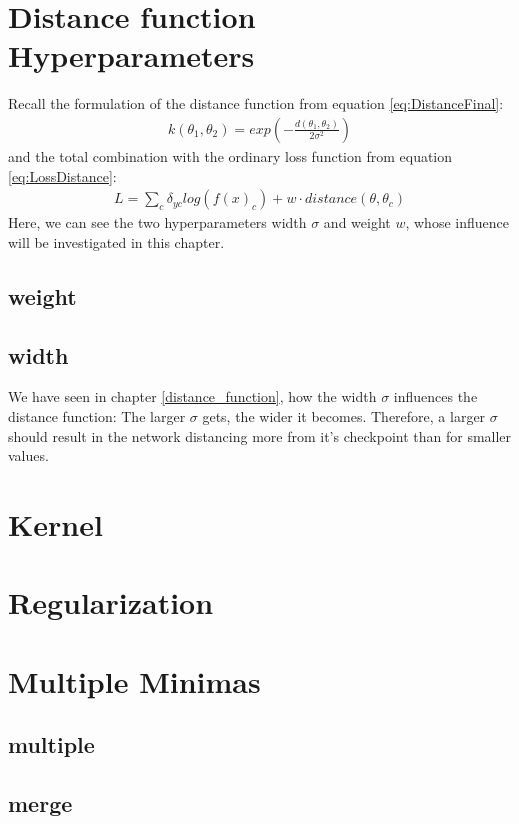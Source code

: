 \section{Distance function Hyperparameters}\label{res:Hyperparameters}
Recall the formulation of the distance function from equation
\ref{eq:DistanceFinal}:
\begin{align}
    k(\theta_1, \theta_2)=exp(-\frac{d(\theta_1, \theta_2)}{2\sigma^2})
\end{align}
and the total combination with the ordinary loss function from equation
\ref{eq:LossDistance}:
\begin{align}
    L=\sum_{c} \delta_{yc} log(f(x)_c) + w \cdot distance(\theta, \theta_c)
\end{align}
Here, we can see the two hyperparameters width $\sigma$ and weight $w$, whose
influence will be investigated in this chapter.
\subsection{weight}

\subsection{width}
We have seen in chapter \ref{distance_function}, how the width $\sigma$
influences the distance function: The larger $\sigma$ gets, the wider it
becomes. Therefore, a larger $\sigma$ should result in the network distancing
more from it's checkpoint than for smaller values. 






\section{Kernel}\label{res:Kernel}

\section{Regularization}

\section{Multiple Minimas}\label{res:Multiple}
\subsection{multiple}
\subsection{merge}

